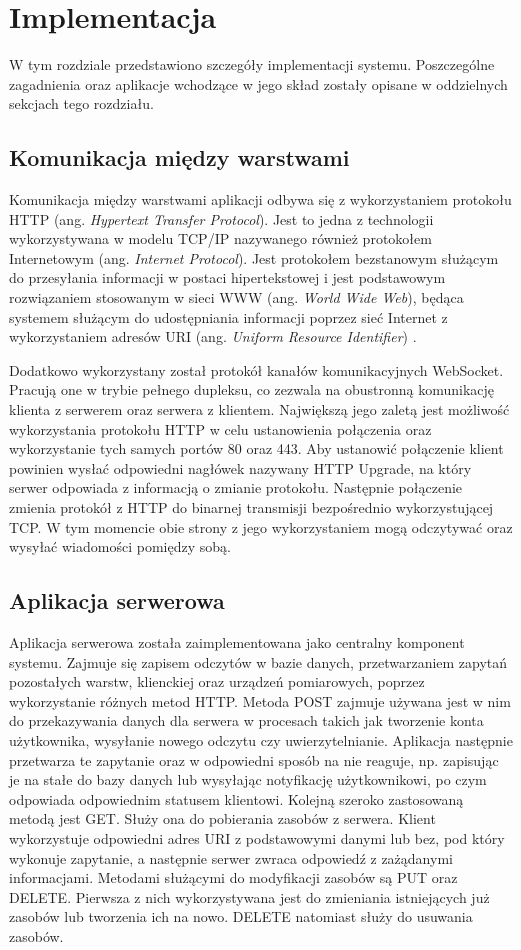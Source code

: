 \chapter{Implementacja}
W tym rozdziale przedstawiono szczegóły implementacji systemu. 
Poszczególne zagadnienia oraz aplikacje wchodzące w jego skład
zostały opisane w oddzielnych sekcjach tego rozdziału.

\section{Komunikacja między warstwami}
Komunikacja między warstwami aplikacji odbywa się z wykorzystaniem protokołu 
HTTP (ang. \textit{Hypertext Transfer Protocol}).
Jest to jedna z technologii wykorzystywana w modelu TCP/IP 
nazywanego również protokołem Internetowym (ang. \textit{Internet Protocol}).
Jest protokołem bezstanowym \cite{http:rfc9110} służącym do przesyłania
informacji w postaci hipertekstowej i jest podstawowym rozwiązaniem
stosowanym w sieci WWW (ang. \textit{World Wide Web}), będąca systemem 
służącym do udostępniania informacji poprzez sieć Internet
z wykorzystaniem adresów URI (ang. \textit{Uniform Resource Identifier}) \cite{Jacobs:04:AWW}.

Dodatkowo wykorzystany został protokół kanałów komunikacyjnych WebSocket.
Pracują one w trybie pełnego dupleksu, co zezwala na obustronną komunikację
klienta z serwerem oraz serwera z klientem. Największą jego zaletą jest
możliwość wykorzystania protokołu HTTP w celu ustanowienia połączenia 
oraz wykorzystanie tych samych portów 80 oraz 443.
Aby ustanowić połączenie klient powinien wysłać odpowiedni
nagłówek nazywany HTTP Upgrade, na który serwer odpowiada z informacją o zmianie protokołu.
Następnie połączenie zmienia protokół z HTTP do binarnej transmisji bezpośrednio wykorzystującej TCP.
W tym momencie obie strony z jego wykorzystaniem mogą odczytywać oraz wysyłać wiadomości
pomiędzy sobą.

\section{Aplikacja serwerowa}
Aplikacja serwerowa została zaimplementowana jako centralny komponent systemu.
Zajmuje się zapisem odczytów w bazie danych, przetwarzaniem zapytań
pozostałych warstw, klienckiej oraz urządzeń pomiarowych,
poprzez wykorzystanie różnych metod HTTP.
Metoda POST zajmuje używana jest w nim do przekazywania danych
dla serwera w procesach takich jak tworzenie konta użytkownika,
wysyłanie nowego odczytu czy uwierzytelnianie.
Aplikacja następnie przetwarza te zapytanie oraz w odpowiedni 
sposób na nie reaguje, np. zapisując je na stałe do bazy danych 
lub wysyłając notyfikację użytkownikowi, po czym odpowiada
odpowiednim statusem klientowi.
Kolejną szeroko zastosowaną metodą jest GET. Służy ona do pobierania
zasobów z serwera. Klient wykorzystuje odpowiedni adres URI z
podstawowymi danymi lub bez, pod który wykonuje zapytanie, a
następnie serwer zwraca odpowiedź z zażądanymi informacjami.
Metodami służącymi do modyfikacji zasobów są PUT oraz DELETE.
Pierwsza z nich wykorzystywana jest do zmieniania istniejących
już zasobów lub tworzenia ich na nowo. DELETE natomiast służy
do usuwania zasobów.


